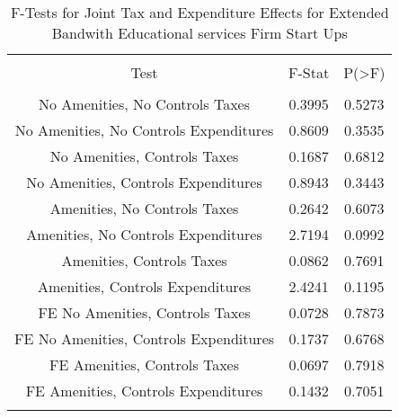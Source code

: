 
\begin{table}[!htbp] \centering 
  \caption{F-Tests for Joint Tax and Expenditure Effects for Extended Bandwith Educational services Firm Start Ups} 
  \label{61Ftests} 
\begin{tabular}{@{\extracolsep{5pt}} ccc} 
\\[-1.8ex]\hline 
\hline \\[-1.8ex] 
Test & F-Stat & P(\textgreater F) \\ 
\hline \\[-1.8ex] 
No Amenities, No Controls Taxes & 0.3995 & 0.5273 \\ 
No Amenities, No Controls Expenditures & 0.8609 & 0.3535 \\ 
No Amenities, Controls Taxes & 0.1687 & 0.6812 \\ 
No Amenities, Controls Expenditures & 0.8943 & 0.3443 \\ 
Amenities, No Controls Taxes & 0.2642 & 0.6073 \\ 
Amenities, No Controls Expenditures & 2.7194 & 0.0992 \\ 
Amenities, Controls Taxes & 0.0862 & 0.7691 \\ 
Amenities, Controls Expenditures & 2.4241 & 0.1195 \\ 
FE No Amenities, Controls Taxes & 0.0728 & 0.7873 \\ 
FE No Amenities, Controls Expenditures & 0.1737 & 0.6768 \\ 
FE Amenities, Controls Taxes & 0.0697 & 0.7918 \\ 
FE Amenities, Controls Expenditures & 0.1432 & 0.7051 \\ 
\hline \\[-1.8ex] 
\end{tabular} 
\end{table} 
